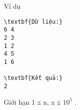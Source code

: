 Ví dụ
\begin{verbatim}
\textbf{Dữ liệu:}
6 4
2 3
1 2
4 5
1 6

\textbf{Kết quả:}
2
\end{verbatim}
Giới hạn
1 ≤ n, x ≤ $10^{5}$ .